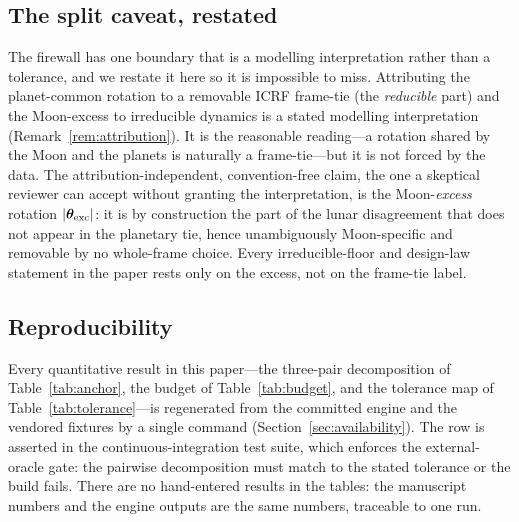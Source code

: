 \subsection{The split caveat, restated}
\label{sec:splitcaveat}

The firewall has one boundary that is a modelling interpretation rather than a
tolerance, and we restate it here so it is impossible to miss. Attributing the
planet-common rotation to a removable ICRF frame-tie (the \emph{reducible} part) and
the Moon-excess to irreducible dynamics is a stated modelling interpretation
(Remark~\ref{rem:attribution}). It is the reasonable reading---a rotation shared by
the Moon and the planets is naturally a frame-tie---but it is not forced by the data.
The attribution-independent, convention-free claim, the one a skeptical reviewer can
accept without granting the interpretation, is the Moon-\emph{excess} rotation
$|\bm{\theta}_{\mathrm{exc}}|$: it is by construction the part of the lunar disagreement that
does not appear in the planetary tie, hence unambiguously Moon-specific and removable
by no whole-frame choice. Every irreducible-floor and design-law statement in the
paper rests only on the excess, not on the frame-tie label.

\subsection{Reproducibility}
\label{sec:reproducibility}

Every quantitative result in this paper---the three-pair decomposition of
Table~\ref{tab:anchor}, the budget of Table~\ref{tab:budget}, and the tolerance map
of Table~\ref{tab:tolerance}---is regenerated from the committed engine and the
vendored fixtures by a single command (Section~\ref{sec:availability}). The
\Validated{} row is asserted in the continuous-integration test suite, which enforces
the external-oracle gate: the pairwise decomposition must match 
to the stated tolerance or the build fails. There are no hand-entered results in the
tables: the manuscript numbers and the engine outputs are the same numbers, traceable
to one run.
